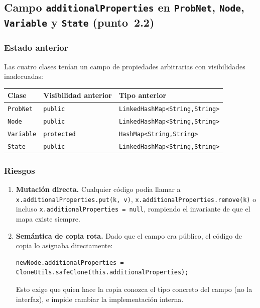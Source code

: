 \documentclass[11pt,a4paper]{article}
\newcommand{\code}[1]{\texttt{#1}}
\begin{document}
\subsection{Campo \code{additionalProperties} en \code{ProbNet}, \code{Node},
            \code{Variable} y \code{State} (punto~2.2)}

\subsubsection*{Estado anterior}

Las cuatro clases tenían un campo de propiedades arbitrarias con
visibilidades inadecuadas:

\begin{center}
\begin{tabular}{lll}
\toprule
\textbf{Clase} & \textbf{Visibilidad anterior} & \textbf{Tipo anterior} \\
\midrule
\code{ProbNet}  & \code{public}    & \code{LinkedHashMap<String,String>} \\
\code{Node}     & \code{public}    & \code{LinkedHashMap<String,String>} \\
\code{Variable} & \code{protected} & \code{HashMap<String,String>} \\
\code{State}    & \code{public}    & \code{LinkedHashMap<String,String>} \\
\bottomrule
\end{tabular}
\end{center}

\subsubsection*{Riesgos}

\begin{enumerate}[label=(\alph*)]
  \item \textbf{Mutación directa.} Cualquier código podía llamar a
    \code{x.additionalProperties.put(k, v)}, \code{x.additional\-Properties.remove(k)}
    o incluso \code{x.additionalProperties = null}, rompiendo el invariante
    de que el mapa existe siempre.

  \item \textbf{Semántica de copia rota.} Dado que el campo era público,
    el código de copia lo asignaba directamente:
    \begin{lstlisting}
newNode.additionalProperties = CloneUtils.safeClone(this.additionalProperties);
    \end{lstlisting}
    Esto exige que quien hace la copia conozca el tipo concreto del campo
    (no la interfaz), e impide cambiar la implementación interna.
\end{enumerate}
\end{document}
